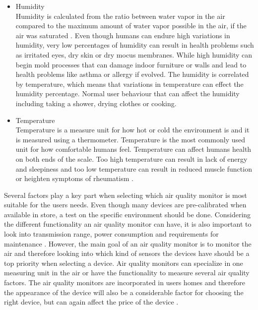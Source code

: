 \begin{itemize}
    \item Humidity\\
        Humidity is calculated from the ratio between water vapor in the air compared to the maximum amount of water vapor possible in the air, if the air was saturated \cite{RecommendedIAQ}. Even though humans can endure high variations in humidity, very low percentages of humidity can result in health problems such as irritated eyes, dry skin or dry mocus membranes. While high humidity can begin mold processes that can damage indoor furniture or walls and lead to health problems like asthma or allergy if evolved. The humidity is correlated by temperature, which means that variations in temperature can effect the humidity percentage. Normal user behaviour that can affect the humidity including taking a shower, drying clothes or cooking. \\
    \item Temperature\\
        Temperature is a measure unit for how hot or cold the environment is and it is measured using a thermometer. Temperature is the most commonly used unit for how comfortable humans feel. Temperature can affect humans health on both ends of the scale. Too high temperature can result in lack of energy and sleepiness and too low temperature can result in reduced muscle function or heighten symptoms of rheumatism \cite{Temp}.\\
\end{itemize}

Several factors play a key part when selecting which air quality monitor is most suitable for the users needs. Even though many devices are pre-calibrated when available in store, a test on the specific environment should be done. Considering the different functionality an air quality monitor can have, it is also important to look into transmission range, power consumption and requirements for maintenance \cite{AQMBigSource}. However, the main goal of an air quality monitor is to monitor the air and therefore looking into which kind of sensors the devices have should be a top priority when selecting a device. Air quality monitors can specialize in one measuring unit in the air or have the functionality to measure several air quality factors. The air quality monitors are incorporated in users homes and therefore the appearance of the device will also be a considerable factor for choosing the right device, but can again affect the price of the device \cite{IAQMonitorCommunicationReview}. 

